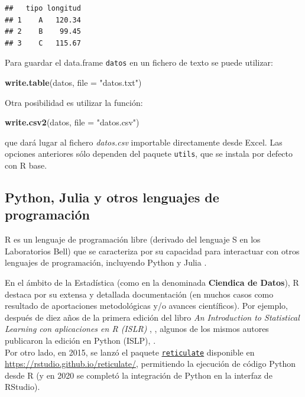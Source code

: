 \documentclass[
]{book}
\newenvironment{Shaded}{\begin{snugshade}}{\end{snugshade}}
\newcommand{\AttributeTok}[1]{\textcolor[rgb]{0.13,0.29,0.53}{#1}}
\newcommand{\FunctionTok}[1]{\textcolor[rgb]{0.13,0.29,0.53}{\textbf{#1}}}
\newcommand{\NormalTok}[1]{#1}
\newcommand{\StringTok}[1]{\textcolor[rgb]{0.31,0.60,0.02}{#1}}
\begin{document}
\begin{verbatim}
##   tipo longitud
## 1    A   120.34
## 2    B    99.45
## 3    C   115.67
\end{verbatim}

Para guardar el data.frame \texttt{datos} en un fichero de texto se
puede utilizar:

\begin{Shaded}
\begin{Highlighting}[]
\FunctionTok{write.table}\NormalTok{(datos, }\AttributeTok{file =} \StringTok{"datos.txt"}\NormalTok{)}
\end{Highlighting}
\end{Shaded}

Otra posibilidad es utilizar la función:

\begin{Shaded}
\begin{Highlighting}[]
\FunctionTok{write.csv2}\NormalTok{(datos, }\AttributeTok{file =} \StringTok{"datos.csv"}\NormalTok{)}
\end{Highlighting}
\end{Shaded}

que dará lugar al fichero \emph{datos.csv} importable directamente desde Excel. Las opciones anteriores sólo dependen del paquete \texttt{utils}, que se instala por defecto con R base.

\subsection{Python, Julia y otros lenguajes de programación}\label{python-julia-y-otros-lenguajes-de-programaciuxf3n}

R es un lenguaje de programación libre (derivado del lenguaje S en los Laboratorios Bell) que se caracteriza por su capacidad para interactuar con otros lenguajes de programación, incluyendo Python \citep{python} y Julia \citep{julia}.

En el ámbito de la Estadística (como en la denominada \textbf{Ciendica de Datos}), R destaca por su extensa y detallada documentación (en muchos casos como resultado de aportaciones metodológicas y/o avances científicos). Por ejemplo, después de diez años de la primera edición del libro \emph{An Introduction to Statistical Learning con aplicaciones en R (ISLR)} , \citet{james2013introduction}, algunos de los mismos autores publicaron la edición en Python (ISLP), \citet{james2023introduction}.\\
Por otro lado, en 2015, se lanzó el paquete \href{https://rstudio.github.io/reticulate/}{\texttt{reticulate}} disponible en \url{https://rstudio.github.io/reticulate/}, permitiendo la ejecución de código Python desde R (y en 2020 se completó la integración de Python en la interfaz de RStudio).
\end{document}
